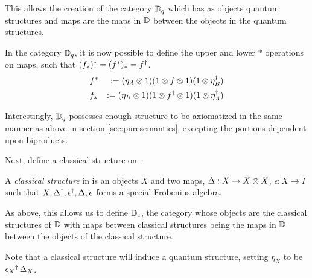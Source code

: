 This allows the creation of the category $\mathbb{D}_{q}$ which has as objects quantum structures and maps
are the maps in $\mathbb{D}$ between the objects in the quantum structures.

In the category $\mathbb{D}_{q}$, it is now possible to define the upper and lower $*$ operations on maps,
such that $(f_{*})^{*}= (f^{*})_{*} = {f}^{\dagger}$.
\begin{eqnarray*}
&f^{*} &:= (\eta_{A}\otimes1) (1 \otimes f\otimes1) (1\otimes{\eta}^{\dagger}_{B})\\
&f_{*} &:= (\eta_{B}\otimes1) (1 \otimes {f}^{\dagger}\otimes1) (1\otimes{\eta}^{\dagger}_{A})
\end{eqnarray*}

Interestingly, $\mathbb{D}_{q}$ possesses enough structure to be axiomatized in the same manner as above in
section \ref{sec:puresemantics}, excepting the portions dependent upon biproducts.

Next, define a classical structure on \cD.
\begin{definition}\label{def:classicalstructure}
  A \emph{classical structure} in \cD{} is an objects $X$ and two maps, $\Delta :X \to X\otimes X$,
  $\epsilon:X\to I$ such that $X,{\Delta}^{\dagger},{\epsilon}^{\dagger},\Delta,\epsilon$ forms a special
  Frobenius algebra.
\end{definition}

As above, this allows us to define $\mathbb{D}_{c}$, the category whose objects are the classical
structures of $\mathbb{D}$ with maps between classical structures being the maps in $\mathbb{D}$ between the
objects of the classical structure.

Note that a classical structure will induce a quantum structure, setting $\eta_{X}$ to be
${\epsilon_{X}}^{\dagger}\, \Delta_{X}$.



